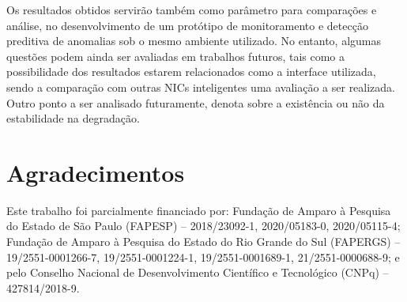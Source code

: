 \documentclass[12pt]{article}
\begin{document}
Os resultados obtidos servirão também como parâmetro para comparações e análise, no desenvolvimento de um protótipo de monitoramento e detecção preditiva de anomalias sob o mesmo ambiente utilizado. No entanto, algumas questões podem ainda ser avaliadas em trabalhos futuros, tais como a possibilidade dos resultados estarem relacionados como a interface utilizada, sendo a comparação com outras NICs inteligentes uma avaliação a ser realizada. Outro ponto a ser analisado futuramente, denota sobre a existência ou não da estabilidade na degradação. 


\section*{Agradecimentos} \label{sec:ack}
Este trabalho foi parcialmente financiado por: 
Fundação de Amparo à Pesquisa do Estado de São Paulo (FAPESP) -- 2018/23092-1, 2020/05183-0, 2020/05115-4; Fundação de Amparo à Pesquisa do Estado do Rio Grande do Sul (FAPERGS) -- 19/2551-0001266-7, 19/2551-0001224-1, 19/2551-0001689-1, 21/2551-0000688-9; e pelo Conselho Nacional de Desenvolvimento Científico e Tecnológico (CNPq) -- 427814/2018-9.




\end{document}

